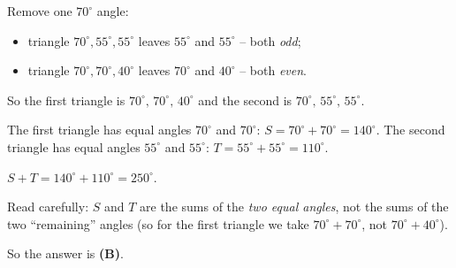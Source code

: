 {
Remove one $70^\circ$ angle:
\begin{itemize}[leftmargin=1.3em,itemsep=0pt,topsep=0pt]
  \item triangle $70^\circ,55^\circ,55^\circ$ leaves $55^\circ$ and $55^\circ$ -- both \emph{odd};
  \item triangle $70^\circ,70^\circ,40^\circ$ leaves $70^\circ$ and $40^\circ$ -- both \emph{even}.
\end{itemize}
So the first triangle is $70^\circ,\,70^\circ,\,40^\circ$ and the second is $70^\circ,\,55^\circ,\,55^\circ$.

The first triangle has equal angles $70^\circ$ and $70^\circ$: $S=70^\circ+70^\circ=140^\circ$.
The second triangle has equal angles $55^\circ$ and $55^\circ$: $T=55^\circ+55^\circ=110^\circ$.

$S+T=140^\circ+110^\circ=250^\circ$.
\begin{warnbox}Read carefully: $S$ and $T$ are the sums of the \emph{two equal angles}, not the sums of the two ``remaining'' angles (so for the first triangle we take $70^\circ+70^\circ$, not $70^\circ+40^\circ$).\end{warnbox}
So the answer is \textbf{(B)}.
}

